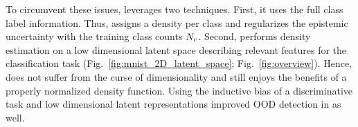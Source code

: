 To circumvent these issues, \PostNetacro leverages two techniques. First, it uses the full class label information. Thus, \PostNetacro assigns a density per class and regularizes the epistemic uncertainty with the training class counts $N_c$. Second, \PostNetacro performs density estimation on a low dimensional latent space describing relevant features for the classification task (Fig.~\ref{fig:mnist_2D_latent_space}; Fig.~\ref{fig:overview}).
Hence, \PostNetacro does not suffer from the curse of dimensionality and still enjoys the benefits of a properly normalized density function. Using the inductive bias of a discriminative task and low dimensional latent representations improved OOD detection in  \cite{why-nf-fail-ood} as well.
